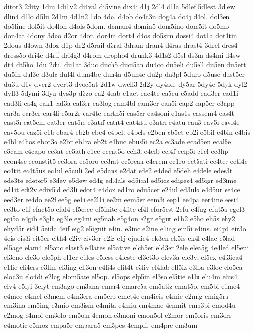 {ditor3
2dity
1diu
1di1v2
di4val
di5vine
dix4i
d1j
2dl4
d1la
5dlef
5dlest
3dlew
dlin4
d1lo
d5lu
2d1m
4d1n2
1do
4do.
d4ob
do4c3u
dog4a
do4j
d4ol.
dol3en
do5line
dol5it
do4lon
d4ols
5dom.
doman4
domin5
dom5ino
dom5it
do5mo
don4at
4dony
3doo
d2or
4dor.
dor4m
dort4
d4os
do5sim
dossi4
dot1a
dot4tin
2dous
d4own
3dox
d1p
dr2
d5rail
d3ral
3dram
dran4
d4ras
drast4
3drel
dres4
dress5o
dri4e
d4rif
dri4g3
d4rom
dropho4
drunk3
4d1s2
d5sl
ds3m
ds4mi
d4sw
dt4
dt5ho
1du
2du.
du1at
3duc
duch5
duci5an
du4co
du5eli
du5ell
du5en
du5ett
du5in
dul3c
d3ule
dul4l
dum4be
dun4a
d5un4c
du2p
du3pl
5duro
d5use
dust5er
du3u
d1v
dver2
dvert3
dvoc5at
2d1w
dwell3
2d2y
dy4ad.
dy5ar
5dy4e
5dyk
dyl2
dyll3
5dymi
3dyn
dys3p
d3zo
ea2
4eab
e1act
eac4te
ea5cu
e5add
ead3er
ead1i
ead3li
ea4g
eak1
eal3a
eal3er
ea3log
eam4bl
eam3er
ean5i
eap2
eap5er
e3app
ear3a
ear3er
ear4li
e5ar2r
ear4te
earth5i
eas5er
ea4soni
e1as1s
eassem4
eas4t
east5i
eat5eni
eat3er
eat5ie
e3atif
eatit4
eat4itu
e3atri
e4atu
eau3
eav5i
eavi4e
eav5ou
eaz5i
e1b
ebar4
eb2b
ebe4
e4bel.
e4bels
e2ben
eb5et
eb2i
e5bil
e4bin
e4bis
e4bl
e4bos
ebot3o
e2br
eb1ra
eb2t
e4buc
ebus5i
ec2a
ec3ade
ecad5en
ecal5e
e5cam
e4capo
ec3at
ec5ath
e1ce
ecent5o
ech3i
e4cib
eci4f
ecip5i
e1cl
ec3lip
econ4sc
econstit5
ec3ora
ec5oro
ec3rat
ec5rean
e4crem
ec1ro
ect5ati
ec4ter
ecti4c
ec4tit
ec4t5us
ec1ul
e5culi
2ed
e5dans
e2dat
ede2
e4ded
e5deh
e4dele
edes3t
ede3te
edeter5
e3dev
e5dew
ed4g
edi4als
ed5ical
ed5ics
ediges4
ed5igr
ed3ime
ed1it
edi2v
ediv5id
ed3li
edor4
e4dox
ed1ro
edu5cer
e2dul
ed3ulo
e4d5ur
ee4ce
eed3er
ee4do
ee2f
ee5g
ee1i
ee2l1i
ee2m
eem5er
eem3i
eep1
ee4pa
eer4ine
eesi4
ee3to
e1f
efact5o
efal4
ef5eree
ef5inite
e4fite
ef4l
efor5est
2efu
e4fug
efut5a
egel3
egi5a
e4gib
e3gla
eg3le
eg4mi
eg5nab
e5g4on
e2gr
e5gur
e1h2
e5ho
eh5s
ehy2
ehyd5r
eid4
5eido
4eif
eig2
e5ignit
e4in.
e3inc
e2ine
e1ing
ein5i
e4ins.
ei4p4
eir3o
4eis
eis3i
eit5er
eith4
e2iv
eiv3er
e2iz
e1j
ejudic4
ek3en
ek5is
ek4l
e4lac
e5lad
el5age
elam4
el5anc
elast3
e4lates
el5ative
elch5er
eld3er
2ele
elea5g
4e4led
el5eni
el3eno
ele3o
ele5ph
el1er
e1les
e5less
e4leste
el3et3o
elev3a
ele3vi
el5ex
e4l3ica4
e1lie
eli4ers
e3lim
el3ing
eli3on
e4li4s
elit4t
e3liv
el4lab
ell5iz
e3loa
e3loc
elo5ca
eloc3u
elo4di
e2log
elom5ate
el5op.
el5ops
elp5in
el3so
el5tie
e1lu
elu4m
elus4
elv4
e5lyi
3elyt
em3ago
em3ana
emar4
emarc5a
em5atiz
emat5ol
em5bi
e1me4
e4mee
e4mel
e3mem
e4m3era
em5ero
emet4e
em4icis
e4mie
e2mig
emig5ra
em3ina
em5ing
e3mio
em3ism
e4mita
e4miu
em4mae
4emnit
emo3bi
emod4u
e2mog
e4moi
em3olo
em5om
4emon
e3moni
emon5ol
e2mor
em5oris
em3orr
e4motic
e5moz
empa5r
empara5
em5pes
4empli.
em4pre
em3um
}
